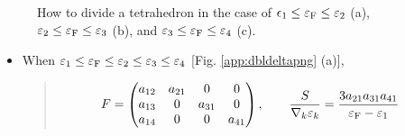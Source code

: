\documentclass[letterpaper,10pt,dvipdfmx,openany]{sphinxmanual}
\begin{document}
\begin{figure}[htbp]
\centering
\capstart

\noindent{}
\caption{How to divide a tetrahedron
in the case of \(\epsilon_1 \leq \varepsilon_{\rm F} \leq \varepsilon_2\) (a),
\(\varepsilon_2 \leq \varepsilon_{\rm F} \leq \varepsilon_3\) (b), and
\(\varepsilon_3 \leq \varepsilon_{\rm F} \leq \varepsilon_4\) (c).}\label{\detokenize{app:id4}}\label{\detokenize{app:dbldeltapng}}\end{figure}
\begin{itemize}
\item {} 
\sphinxAtStartPar
When \(\varepsilon_1 \leq \varepsilon_{\rm F} \leq \varepsilon_2 \leq \varepsilon_3 \leq\varepsilon_4\)
{[}Fig. \ref{app:dbldeltapng} (a){]},
\begin{quote}
\begin{equation*}
\begin{split}\begin{align}
F &=
\begin{pmatrix}
a_{1 2} & a_{2 1} &       0 & 0 \\
a_{1 3} &       0 & a_{3 1} & 0 \\
a_{1 4} &       0 &       0 & a_{4 1}
\end{pmatrix},
\qquad
\frac{S}{\nabla_k \varepsilon_k} = \frac{3 a_{2 1} a_{3 1} a_{4 1}}{\varepsilon_{\rm F} - \varepsilon_1}
\end{align}\end{split}
\end{equation*}\end{quote}


\end{itemize}
\end{document}
